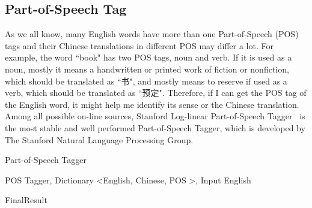 \documentclass[11pt]{article}
\begin{document}
\subsection{Part-of-Speech Tag}
As we all know, many English words have more than one Part-of-Speech (POS) tags and their Chinese translations in different POS may differ a lot. For example, the word ``book" has two POS tags, noun and verb. If it is used as a noun, mostly it means a handwritten or printed work of fiction or nonfiction, which should be translated as ``书", and mostly means to reserve if used as a verb, which should be translated as ``预定". Therefore, if I can get the POS tag of the English word, it might help me identify its sense or the Chinese translation.
\\
Among all possible on-line sources, Stanford Log-linear Part-of-Speech Tagger~\cite{Toutanova2003} is the most stable and well performed Part-of-Speech Tagger, which is developed by The Stanford Natural Language Processing Group.
\\
\begin{algorithm}[ht]
\caption{Part-of-Speech Tagger}
\label{algorithm:wsd_1}
\begin{algorithmic}
\REQUIRE POS Tagger, Dictionary \textless English, Chinese, POS \textgreater, Input English


        \ENDIF
    \ENDFOR
        \ENDIF
    \ENDFOR
\ENDIF
\RETURN FinalResult
\end{algorithmic}
\end{algorithm}
\end{document}
